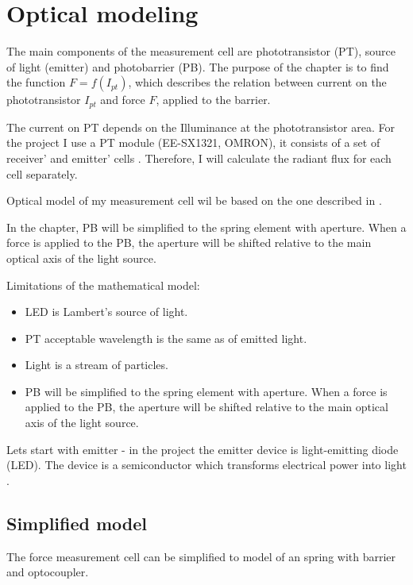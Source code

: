 \chapter{Optical modeling}
\label{chapter:optical_modeling}

The main components of the measurement cell are phototransistor (PT), source of light (emitter) and photobarrier (PB). 
The purpose of the chapter is to find the function $F = f(I_{pt})$, which describes the relation between current on the phototransistor $I_{pt}$ and force $F$, applied to the barrier.

The current on PT depends on the Illuminance at the phototransistor area. 
For the project I use a PT module (EE-SX1321, OMRON), it consists of a set of receiver' and emitter' cells \cite[Fig. 4]{my_love_pressure_photosensor}.
Therefore, I will calculate the radiant flux for each cell separately.

Optical model of my measurement cell wil be based on the one described in \cite{my_love_pressure_photosensor}.

In the chapter, PB will be simplified to the spring element with aperture. When a force is applied to the PB, the aperture will be shifted relative to the main optical axis of the light source.


Limitations of the mathematical model:
\begin{itemize}
    \item LED is Lambert's source of light.
    \item PT acceptable wavelength is the same as of emitted light.
    \item Light is a stream of particles.
    \item PB will be simplified to the spring element with aperture. When a force is applied to the PB, the aperture will be shifted relative to the main optical axis of the light source.
\end{itemize}


Lets start with emitter - in the project the emitter device is light-emitting diode (LED). The device is a semiconductor which transforms electrical power into light \cite{LED_flux_estimation}.

\section{Simplified model}

The force measurement cell can be simplified to model of an spring with barrier and optocoupler.

